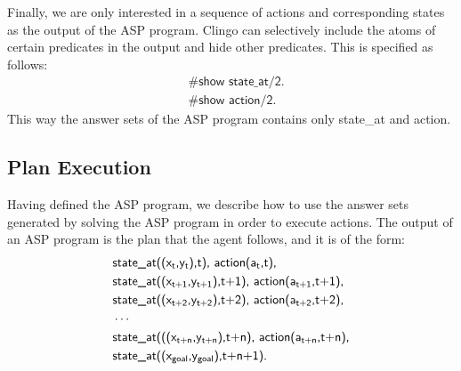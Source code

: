 Finally, we are only interested in a sequence of actions and corresponding states as the output of the ASP program. 
Clingo can selectively include the atoms of certain predicates in the output and hide other predicates. 
This is specified as follows:
\begin{equation}
\begin{split}
&\textsf{\#show state\_at/2.} \\
&\textsf{\#show action/2.}
\end{split}
\end{equation}
This way the answer sets of the ASP program contains only \textsf{state\_at} and \textsf{action}.

\subsection{Plan Execution}
\label{subsec:plan_execution}
Having defined the ASP program, we describe how to use the answer sets generated by solving the ASP program in order to execute actions.
The output of an ASP program is the plan that the agent follows, and it is of the form:
\begin{equation}
\begin{split}
&\textsf{state\_at((x\textsubscript{t},y\textsubscript{t}),t), action(a\textsubscript{t},t),}\\
&\textsf{state\_at((x\textsubscript{t+1},y\textsubscript{t+1}),t+1), action(a\textsubscript{t+1},t+1),}\\
&\textsf{state\_at((x\textsubscript{t+2},y\textsubscript{t+2}),t+2), action(a\textsubscript{t+2},t+2),}\\
&\cdots\\
&\textsf{state\_at(((x\textsubscript{t+n},y\textsubscript{t+n}),t+n), action(a\textsubscript{t+n},t+n),}\\
&\textsf{state\_at((x\textsubscript{goal},y\textsubscript{goal}),t+n+1).} 
\end{split}
\end{equation}

